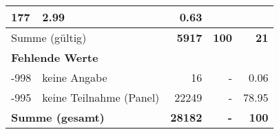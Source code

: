 \begin{longtable}{lXrrr}
       \num{177} &
       \num[round-mode=places,round-precision=2]{2.99} &
         \num[round-mode=places,round-precision=2]{0.63} \\
     \midrule
     \multicolumn{2}{l}{Summe (gültig)} &
       \textbf{\num{5917}} &
     \textbf{\num{100}} &
       \textbf{\num[round-mode=places,round-precision=2]{21}} \\
     \multicolumn{5}{l}{\textbf{Fehlende Werte}}\\
       -998 &
       keine Angabe &
         \num{16} &
        - &
         \num[round-mode=places,round-precision=2]{0.06} \\
       -995 &
       keine Teilnahme (Panel) &
         \num{22249} &
        - &
         \num[round-mode=places,round-precision=2]{78.95} \\
     \midrule
     \multicolumn{2}{l}{\textbf{Summe (gesamt)}} &
          \textbf{\num{28182}} &
        \textbf{-} &
        \textbf{\num{100}} \\
     \bottomrule
     \end{longtable}
     
